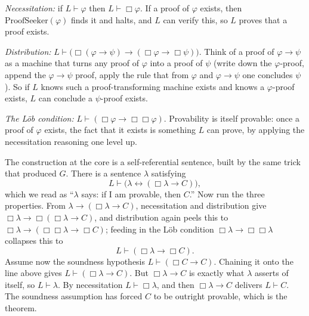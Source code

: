 \documentclass[10pt]{article}
\theoremstyle{definition}
\theoremstyle{remark}
\newcommand{\prov}{\vdash}            %
\newcommand{\Prov}{\Box}              %
\newcommand{\PS}{\mathrm{ProofSeeker}}
\begin{document}
\emph{Necessitation:} if $L \prov \varphi$ then $L \prov \Prov \varphi$. If a proof of $\varphi$ exists, then $\PS(\varphi)$ finds it and halts, and $L$ can verify this, so $L$ proves that a proof exists.

\emph{Distribution:} $L \prov \big(\Prov(\varphi \to \psi) \to (\Prov\varphi \to \Prov\psi)\big)$. Think of a proof of $\varphi \to \psi$ as a machine that turns any proof of $\varphi$ into a proof of $\psi$ (write down the $\varphi$-proof, append the $\varphi \to \psi$ proof, apply the rule that from $\varphi$ and $\varphi\to\psi$ one concludes $\psi$). So if $L$ knows such a proof-transforming machine exists and knows a $\varphi$-proof exists, $L$ can conclude a $\psi$-proof exists.

\emph{The L\"ob condition:} $L \prov (\Prov\varphi \to \Prov\Prov\varphi)$. Provability is itself provable: once a proof of $\varphi$ exists, the fact that it exists is something $L$ can prove, by applying the necessitation reasoning one level up.

The construction at the core is a self-referential sentence, built by the same trick that produced $G$. There is a sentence $\lambda$ satisfying
\[
L \prov \big(\lambda \leftrightarrow (\Prov\lambda \to C)\big),
\]
which we read as ``$\lambda$ says: if I am provable, then $C$.'' Now run the three properties. From $\lambda \to (\Prov\lambda \to C)$, necessitation and distribution give $\Prov\lambda \to \Prov(\Prov\lambda \to C)$, and distribution again peels this to $\Prov\lambda \to (\Prov\Prov\lambda \to \Prov C)$; feeding in the L\"ob condition $\Prov\lambda \to \Prov\Prov\lambda$ collapses this to
\[
L \prov (\Prov\lambda \to \Prov C).
\]
Assume now the soundness hypothesis $L \prov (\Prov C \to C)$. Chaining it onto the line above gives $L \prov (\Prov\lambda \to C)$. But $\Prov\lambda \to C$ is exactly what $\lambda$ asserts of itself, so $L \prov \lambda$. By necessitation $L \prov \Prov\lambda$, and then $\Prov\lambda \to C$ delivers $L \prov C$. The soundness assumption has forced $C$ to be outright provable, which is the theorem.
\end{document}
